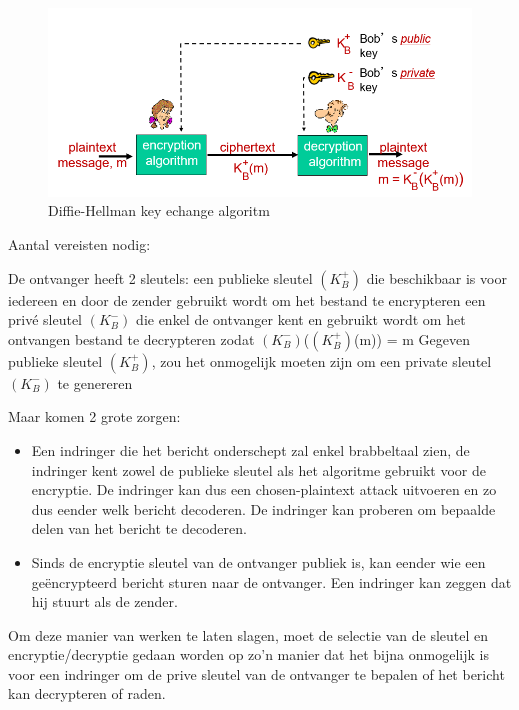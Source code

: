 \begin{figure}[h]
    \centering
    \includegraphics[width=7in]{./img/imghfdst8/hfdst8puntje5.png}
    \caption{Diffie-Hellman key echange algoritm }      
    \label{fig:Diffie-Hellman key echange algoritm }
\end{figure}

\noindent Aantal vereisten nodig:

\be
\itf De ontvanger heeft 2 sleutels:
    \be
    \itf een publieke sleutel $(K^+_B)$ die beschikbaar is voor iedereen en door de zender gebruikt wordt om het bestand te encrypteren
    \itf een privé sleutel $(K^-_B)$ die enkel de ontvanger kent en gebruikt wordt om het ontvangen bestand te decrypteren
   \itf zodat $(K^-_B)$($(K^+_B)$(m)) = m
    \ee
\itf Gegeven publieke sleutel $(K^+_B)$, zou het onmogelijk moeten zijn om een private sleutel $(K^-_B)$ te genereren
\ee

\noindent Maar komen 2 grote zorgen:
\begin{itemize}
\item Een indringer die het bericht onderschept zal enkel brabbeltaal zien, de indringer kent zowel de publieke sleutel als het algoritme gebruikt voor de encryptie. De indringer kan dus een chosen-plaintext attack uitvoeren en zo dus eender welk bericht decoderen. De indringer kan proberen om bepaalde delen van het bericht te decoderen.
\item Sinds de encryptie sleutel van de ontvanger publiek is, kan eender wie een geëncrypteerd bericht sturen naar de ontvanger. Een indringer kan zeggen dat hij stuurt als de zender.

\end{itemize}

\noindent Om deze manier van werken te laten slagen, moet de selectie van de sleutel en encryptie/decryptie gedaan worden op zo’n manier dat het bijna onmogelijk is voor een indringer om de prive sleutel van de ontvanger te bepalen of het bericht kan decrypteren of raden.


